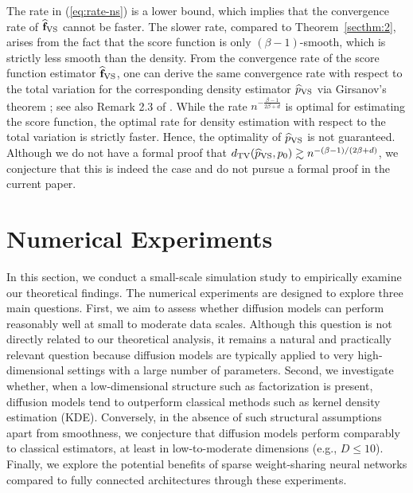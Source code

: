 \documentclass[twoside,11pt]{article}
\newcommand{\bff}{{\bf f}}
\begin{document}
The rate in (\ref{eq:rate-ns}) is a lower bound, which implies that the convergence rate of $\widehat \bff_{\rm VS}$ cannot be faster. The slower rate, compared to Theorem~\ref{secthm:2}, arises from the fact that the score function is only $(\beta-1)$-smooth, which is strictly less smooth than the density.
From the convergence rate of the score function estimator $\widehat\bff_{\rm VS}$, one can derive the same convergence rate with respect to the total variation for the corresponding density estimator $\widehat p_{\rm VS}$ via Girsanov's theorem \citep{girsanov1960transforming, le2016brownian}; see also Remark 2.3 of \citet{bogachev2016distances}.
While the rate $n^{-\frac{ \beta-1}{ 2 \beta + d }}$ is optimal for estimating the score function, the optimal rate for density estimation with respect to the total variation is strictly faster.
Hence, the optimality of $\widehat{p}_{\rm VS}$ is not guaranteed.
Although we do not have a formal proof that $d_{\rm TV}(\widehat{p}_{\rm VS}, p_0) \gtrsim n^{-(\beta-1)/(2\beta + d)}$, we conjecture that this is indeed the case and do not pursue a formal proof in the current paper.



\section{Numerical Experiments}
\label{sec:exp}

In this section, we conduct a small-scale simulation study to empirically examine our theoretical findings. The numerical experiments are designed to explore three main questions. First, we aim to assess whether diffusion models can perform reasonably well at small to moderate data scales. Although this question is not directly related to our theoretical analysis, it remains a natural and practically relevant question because diffusion models are typically applied to very high-dimensional settings with a large number of parameters. Second, we investigate whether, when a low-dimensional structure such as factorization is present, diffusion models tend to outperform classical methods such as kernel density estimation (KDE). Conversely, in the absence of such structural assumptions apart from smoothness, we conjecture that diffusion models perform comparably to classical estimators, at least in low-to-moderate dimensions (e.g., $D \le 10$). Finally, we explore the potential benefits of sparse weight-sharing neural networks compared to fully connected architectures through these experiments.
\end{document}
